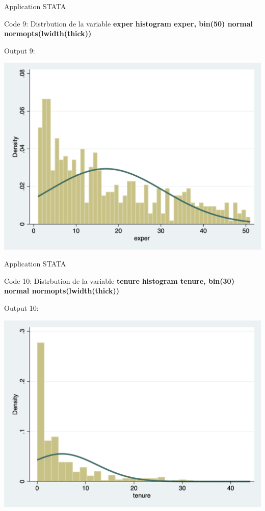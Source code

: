 \documentclass{beamer}
\begin{document}
\begin{frame}{Application STATA}
\begin{block}{Code 9: Distrbution de la variable \textbf{exper}}
\textbf{histogram exper, bin(50) normal normopts(lwidth(thick))}
\end{block}

\begin{block}{Output 9:}
\begin{center}
\includegraphics[scale=.3]{PLOT_6.png}
\end{center}
\end{block}
\end{frame}

\begin{frame}{Application STATA}
\begin{block}{Code 10: Distrbution de la variable \textbf{tenure}}
\textbf{histogram tenure, bin(30) normal normopts(lwidth(thick))}
\end{block}

\begin{block}{Output 10:}
\begin{center}
\includegraphics[scale=.3]{PLOT_7.png}
\end{center}
\end{block}
\end{frame}
\end{document}
